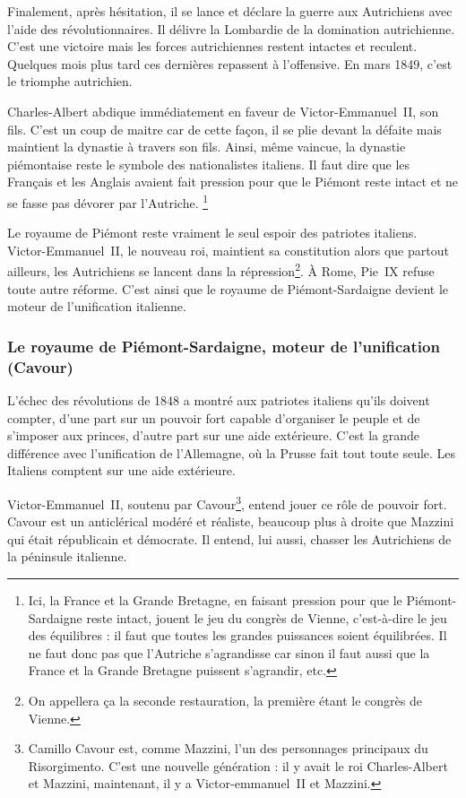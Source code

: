 \documentclass[12pt]{report}
\begin{document}
Finalement, après hésitation, il se lance et déclare la guerre aux Autrichiens avec l’aide des révolutionnaires. 
Il délivre la Lombardie de la domination autrichienne. 
C’est une victoire mais les forces autrichiennes restent intactes et reculent. 
Quelques mois plus tard ces dernières repassent à l’offensive. 
En mars 1849, c’est le triomphe autrichien.

Charles-Albert abdique immédiatement en faveur de Victor-Emmanuel~II, son fils.
C’est un coup de maitre car de cette façon, il se plie devant la défaite mais maintient la dynastie à travers son fils. 
Ainsi, même vaincue, la dynastie piémontaise reste le symbole des nationalistes italiens. 
Il faut dire que les Français et les Anglais avaient fait pression pour que le Piémont reste intact et ne se fasse pas dévorer par l'Autriche.
\footnote{Ici, la France et la Grande Bretagne, en faisant pression pour que le Piémont-Sardaigne reste intact, jouent le jeu du congrès de Vienne, c'est-à-dire le jeu des équilibres : il faut que toutes les grandes puissances soient équilibrées. Il ne faut donc pas que l'Autriche s'agrandisse car sinon il faut aussi que la France et la Grande Bretagne puissent s'agrandir, etc.}

Le royaume de Piémont reste vraiment le seul espoir des patriotes italiens. 
Victor-Emmanuel~II, le nouveau roi, maintient sa constitution alors que partout ailleurs, les Autrichiens se lancent dans la répression\footnote{On appellera ça la seconde restauration, la première étant le congrès de Vienne.}.
À Rome, Pie~IX refuse toute autre réforme.
C'est ainsi que le royaume de Piémont-Sardaigne devient le moteur de l'unification italienne.

\subsubsection{Le royaume de Piémont-Sardaigne, moteur de l'unification (Cavour)}


L’échec des révolutions de 1848 a montré aux patriotes italiens qu'ils doivent compter, d'une part sur un pouvoir fort capable d'organiser le peuple et de s'imposer aux princes, d'autre part sur une aide extérieure.
C'est la grande différence avec l'unification de l'Allemagne, où la Prusse fait tout toute seule.
Les Italiens comptent sur une aide extérieure.

Victor-Emmanuel~II, soutenu par Cavour\footnote{Camillo Cavour est, comme Mazzini, l'un des personnages principaux du Risorgimento. C'est une nouvelle génération : il y avait le roi Charles-Albert et Mazzini, maintenant, il y a Victor-emmanuel~II et Mazzini.}, entend jouer ce rôle de pouvoir fort.
Cavour est un anticlérical modéré et réaliste, beaucoup plus à droite que Mazzini qui était républicain et démocrate.
Il entend, lui aussi, chasser les Autrichiens de la péninsule italienne.
\end{document}
